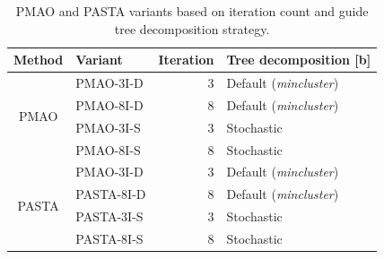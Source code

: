 \begin{table}[!htbp]
  \centering
  \caption{PMAO and PASTA variants based on iteration count and guide tree decomposition strategy.}
    \begin{tabular}{c|l|r|l}
    \multicolumn{1}{l}{Method} & Variant & \multicolumn{1}{l|}{Iteration} & Tree decomposition [b]\\
    \hline
    \multirow{4}{*}{PMAO} & PMAO-3I-D  & 3     & Default (\textit{mincluster}) \\
\cline{2-4}          & 	PMAO-8I-D  & 8     & Default (\textit{mincluster}) \\
\cline{2-4}          & PMAO-3I-S  & 3     & Stochastic \\
\cline{2-4}          & PMAO-8I-S  & 8     & Stochastic\\
\hline \hline
    \multirow{4}{*}{PASTA} & PMAO-3I-D  & 3     & Default (\textit{mincluster}) \\
\cline{2-4}          & PASTA-8I-D  & 8     & Default (\textit{mincluster}) \\
\cline{2-4}          & PASTA-3I-S  & 3     & Stochastic \\
\cline{2-4}          & PASTA-8I-S  & 8     & Stochastic\\
    \hline
    \end{tabular}%
  \label{tab:variants}%
\end{table}%



